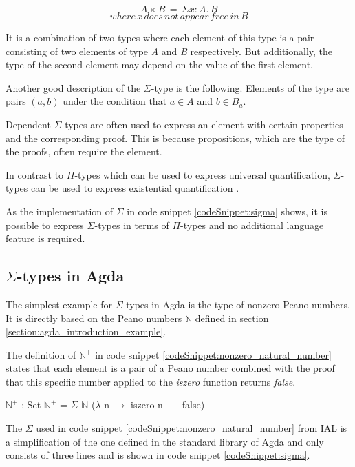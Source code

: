 $$A \times B \,= \,\Sigma x:A. \, B$$
$$where \, x \, does \, not \, appear \, free \, in \, B$$

It is a combination of two types where each element of this type is a pair consisting of two elements of type \emph{A} and \emph{B} respectively.
But additionally, the type of the second element may depend on the value of the first element.

Another good description of the $\Sigma$-type is the following. 
Elements of the type are pairs $(a, b)$ under the condition that $a \in A$ and $b \in B_a$.

Dependent $\Sigma$-types are often used to express an element with certain properties and the corresponding proof.
This is because propositions, which are the type of the proofs, often require the element.

In contrast to $\Pi$-types which can be used to express universal quantification, $\Sigma$-types can be used to express existential quantification \cite{plfa2019}.

As the implementation of $\Sigma$ in code snippet \ref{codeSnippet:sigma} shows, it is possible to express $\Sigma$-types in terms of $\Pi$-types and no additional language feature is required.

\subsection{$\Sigma$-types in Agda}
The simplest example for $\Sigma$-types in Agda is the type of nonzero Peano numbers.
It is directly based on the Peano numbers $\mathbb{N}$ defined in section \ref{section:agda_introduction_example}.

The definition of $\mathbb{N}^+$ in code snippet \ref{codeSnippet:nonzero_natural_number} states that each element is a pair of a Peano number combined with the proof that this specific number applied to the \emph{iszero} function returns \emph{false}.

\begin{codesnippet}[mathescape=true, caption={Definition of nonzero Peano numbers}, label={codeSnippet:nonzero_natural_number}]
$\mathbb{N}^+$ : Set
$\mathbb{N}^+$ = $\Sigma$ $\mathbb{N}$ ($\lambda$ n $\rightarrow$ iszero n $\equiv$ false)
\end{codesnippet}

The $\Sigma$ used in code snippet \ref{codeSnippet:nonzero_natural_number} from IAL is a simplification of the one defined in the standard library of Agda and only consists of three lines and is shown in code snippet \ref{codeSnippet:sigma}.

